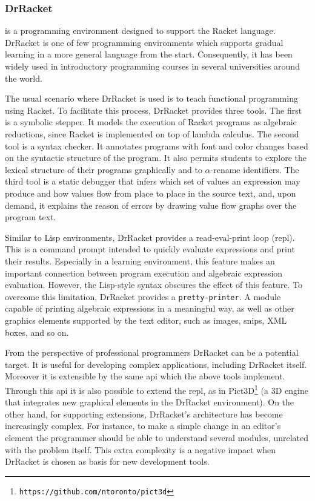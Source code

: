 \subsubsection{DrRacket~\cite{findler2002drscheme}} is a programming environment designed to support the Racket language. DrRacket is one of few programming environments which supports gradual learning in a more general language from the start. Consequently, it has been widely used in introductory programming courses in several universities around the world.

The usual scenario where DrRacket is used is to teach functional programming using Racket. To facilitate this process, DrRacket provides three tools. The first is a symbolic stepper. It models the execution of Racket programs as algebraic reductions, since Racket is implemented on top of lambda calculus. The second tool is a syntax checker. It annotates programs with font and color changes based on the syntactic structure of the program. It also permits students to explore the lexical structure of their programs graphically and to $\alpha$-rename identifiers. The third tool is a static debugger that infers which set of values an expression may produce and how values flow from place to place in the source text, and, upon demand, it explains the reason of errors by drawing value flow graphs over the program text.

Similar to Lisp environments, DrRacket provides a read-eval-print loop (\ac{repl}). This is a command prompt intended to quickly evaluate expressions and print their results. Especially in a learning environment, this feature makes an important connection between program execution and algebraic expression evaluation. However, the Lisp-style syntax obscures the effect of this feature. To overcome this limitation, DrRacket provides a \texttt{pretty-printer}. A module capable of printing algebraic expressions in a meaningful way, as well as other graphics elements supported by the text editor, such as images, snips, XML boxes, and so on.

From the perspective of professional programmers DrRacket can be a potential target. It is useful for developing complex applications, including DrRacket itself. Moreover it is extensible by the same \ac{api} which the above tools implement. Through this \ac{api} it is also possible to extend the \ac{repl}, as in Pict3D\footnote{\texttt{https://github.com/ntoronto/pict3d}} (a 3D engine that integrates new graphical elements in the DrRacket environment). On the other hand, for supporting extensions, DrRacket's architecture has become increasingly complex. For instance, to make a simple change in an editor's element the programmer should be able to understand several modules, unrelated with the problem itself. This extra complexity is a negative impact when DrRacket is chosen as basis for new development tools.

